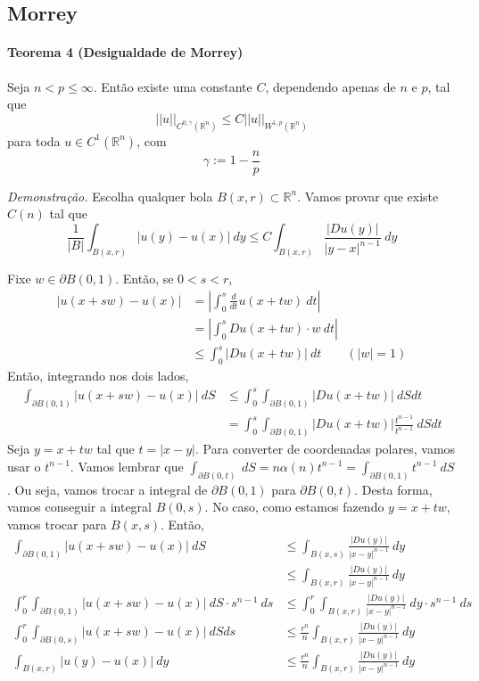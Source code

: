 \documentclass[a4paper, 11pt]{book}
\newcommand{\Rn}{{\mathbb{R}^n}}
\newcommand{\p}{\partial}
\begin{document}
\subsection{Morrey}

\paragraph{Teorema 4 (Desigualdade de Morrey)}\label{t:sobolev-ineq-t4} Seja \( n < p \leq \infty \). Então existe uma constante \( C\), dependendo apenas de \(n\) e \(p\), tal que \[ ||u||_{C^{0, \gamma}(\Rn)} \leq C ||u||_{W^{1,p}(\Rn)} \] para toda \( u \in C^1 (\Rn)\), com \[ \gamma := 1 - \frac{n}{p} \]

\textit{Demonstração.} Escolha qualquer bola $B(x,r) \subset \Rn$. Vamos provar que existe $ C(n) $ tal que \[ \frac{1}{|B|} \int_{B(x,r)} |u(y) - u(x)| \ dy \leq C \int_{B(x,r)}  \frac{|Du(y)|}{|y-x|^{n-1}}\ dy   \]

Fixe $w \in \p B(0,1)$. Então, se $0 < s < r$, \begin{align*}
	| u(x+sw) - u(x) | &= \left| \int_0^s \frac{d}{dt}u(x + tw)\ dt \right| \\
	&= \left| \int_0^s Du(x+tw)\cdot w \ dt\right| \\
	& \leq \int_0^s \left| Du(x+tw) \right| \ dt \qquad (|w|=1)
\end{align*} Então, integrando nos dois lados,
\begin{align*}
	\int_{\p B(0,1)} | u(x+sw) - u(x) |\ dS &\leq \int_0^s \int_{\p B(0,1)}  \left| Du(x+tw) \right| \ dS dt \\
	&= \int_0^s \int_{\p B(0,1)}  \left| Du(x+tw) \right| \frac{t^{n-1}}{t^{n-1}} \ dS dt 
\end{align*} Seja $y=x+tw$ tal que $t = |x-y|$. Para converter de coordenadas polares, vamos usar o $t^{n-1}$. Vamos lembrar que $\int_{\p B(0,t)}\ dS = n \alpha(n) t^{n-1} = \int_{\p B(0,1)} t^{n-1}\ dS$. Ou seja, vamos trocar a integral de $\p B(0,1)$ para $\p B(0,t)$. Desta forma, vamos conseguir a integral $B(0,s)$. No caso, como estamos fazendo $y=x+tw$, vamos trocar para $B(x,s)$. Então, \begin{align*}
\int_{\p B(0,1)} | u(x+sw) - u(x) |\ dS &\leq \int_{B(x,s)} \frac{|Du(y)|}{|x-y|^{n-1}}\ dy \\
&\leq \int_{B(x,r)} \frac{|Du(y)|}{|x-y|^{n-1}}\ dy \\
\int_0^r \int_{\p B(0,1)} | u(x+sw) - u(x) |\ dS \cdot s^{n-1}\ ds &\leq \int_0^r \int_{B(x,r)} \frac{|Du(y)|}{|x-y|^{n-1}}\ dy \cdot s^{n-1}\ ds\\
\int_0^r \int_{\p B(0,s)} | u(x+sw) - u(x) |\ dS ds &\leq \frac{r^n}{n} \int_{B(x,r)} \frac{|Du(y)|}{|x-y|^{n-1}}\ dy  \\
\int_{ B(x,r)} | u(y) - u(x) |\ dy &\leq \frac{r^n}{n} \int_{B(x,r)} \frac{|Du(y)|}{|x-y|^{n-1}}\ dy 
\end{align*}
\end{document}
